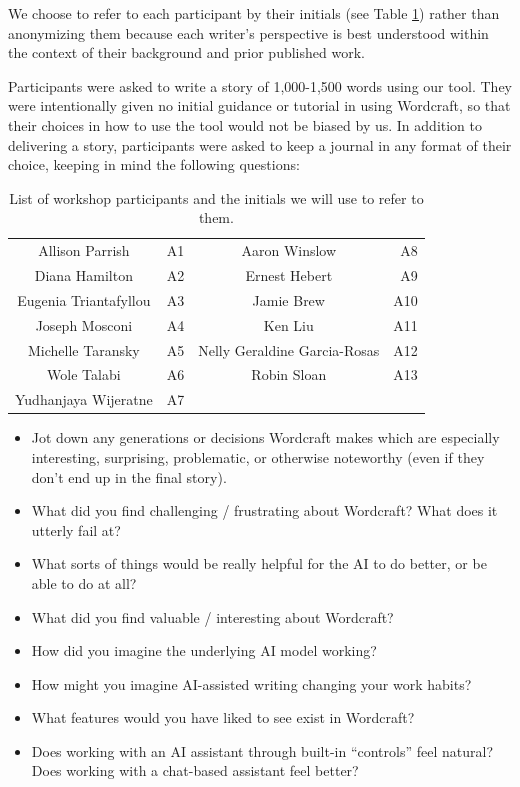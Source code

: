 We choose to refer to each participant by their initials (see Table \ref{tab:writer_initials}) rather than anonymizing them because each writer's perspective is best understood within the context of their background and prior published work.


Participants were asked to write a story of 1,000-1,500 words using our tool.
They were intentionally given no initial guidance or tutorial in using Wordcraft, so that their choices in how to use the tool would not be biased by us.
In addition to delivering a story, participants were asked to keep a journal in any format of their choice, keeping in mind the following questions:

\begin{table}[t]
    \centering
    \small
    \caption{List of workshop participants and the initials we will use to refer to them.}
    \begin{tabular}{cr|cr}
    \hline
Allison Parrish & A1 & Aaron Winslow & A8 \\
Diana Hamilton & A2 & Ernest Hebert & A9 \\
Eugenia Triantafyllou & A3 & Jamie Brew & A10 \\
Joseph Mosconi & A4 & Ken Liu & A11 \\
Michelle Taransky & A5 & Nelly Geraldine Garcia-Rosas & A12 \\
Wole Talabi & A6 & Robin Sloan & A13 \\
Yudhanjaya Wijeratne & A7 & & \\
\hline
    \end{tabular}
    \label{tab:writer_initials}
\end{table}

\begin{itemize}
    \item Jot down any generations or decisions Wordcraft makes which are especially interesting, surprising, problematic, or otherwise noteworthy (even if they don't end up in the final story).
    \item What did you find challenging / frustrating about Wordcraft?  What does it utterly fail at?
    \item  What sorts of things would be really helpful for the AI to do better, or be able to do at all?
    \item What did you find valuable / interesting about Wordcraft?
    \item How did you imagine the underlying AI model working?
    \item How might you imagine AI-assisted writing changing your work habits? 
    \item What features would you have liked to see exist in Wordcraft?
    \item Does working with an AI assistant through built-in “controls” feel natural? Does working with a chat-based assistant feel better?
\end{itemize}

